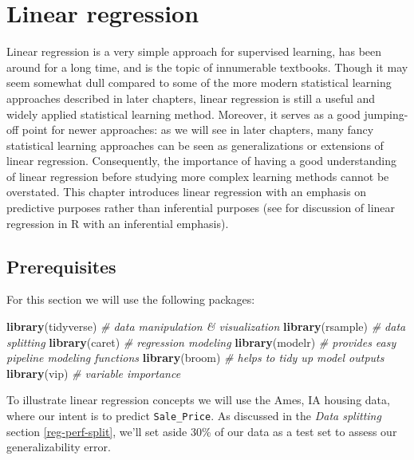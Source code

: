 \documentclass[]{book}
\newenvironment{Shaded}{\begin{snugshade}}{\end{snugshade}}
\newcommand{\CommentTok}[1]{\textcolor[rgb]{0.56,0.35,0.01}{\textit{#1}}}
\newcommand{\KeywordTok}[1]{\textcolor[rgb]{0.13,0.29,0.53}{\textbf{#1}}}
\newcommand{\NormalTok}[1]{#1}
\theoremstyle{definition}
\theoremstyle{definition}
\theoremstyle{definition}
\theoremstyle{remark}
\begin{document}
\hypertarget{linear-regression}{%
\chapter{Linear regression}\label{linear-regression}}

Linear regression is a very simple approach for supervised learning, has
been around for a long time, and is the topic of innumerable textbooks.
Though it may seem somewhat dull compared to some of the more modern
statistical learning approaches described in later chapters, linear
regression is still a useful and widely applied statistical learning
method. Moreover, it serves as a good jumping-off point for newer
approaches: as we will see in later chapters, many fancy statistical
learning approaches can be seen as generalizations or extensions of
linear regression. Consequently, the importance of having a good
understanding of linear regression before studying more complex learning
methods cannot be overstated. This chapter introduces linear regression
with an emphasis on predictive purposes rather than inferential purposes
(see \citet{faraway2016linear} for discussion of linear regression in R
with an inferential emphasis).

\hypertarget{prerequisites-3}{%
\section{Prerequisites}\label{prerequisites-3}}

For this section we will use the following packages:

\begin{Shaded}
\begin{Highlighting}[]
\KeywordTok{library}\NormalTok{(tidyverse)  }\CommentTok{# data manipulation & visualization}
\KeywordTok{library}\NormalTok{(rsample)    }\CommentTok{# data splitting}
\KeywordTok{library}\NormalTok{(caret)      }\CommentTok{# regression modeling}
\KeywordTok{library}\NormalTok{(modelr)     }\CommentTok{# provides easy pipeline modeling functions}
\KeywordTok{library}\NormalTok{(broom)      }\CommentTok{# helps to tidy up model outputs}
\KeywordTok{library}\NormalTok{(vip)        }\CommentTok{# variable importance}
\end{Highlighting}
\end{Shaded}

To illustrate linear regression concepts we will use the Ames, IA
housing data, where our intent is to predict \texttt{Sale\_Price}. As
discussed in the \emph{Data splitting} section \ref{reg-perf-split},
we'll set aside 30\% of our data as a test set to assess our
generalizability error.
\end{document}
